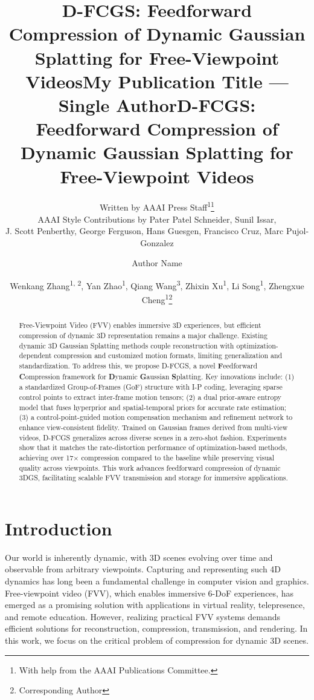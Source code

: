 \documentclass[letterpaper]{article} %
\title{D-FCGS: Feedforward Compression of Dynamic Gaussian Splatting for Free-Viewpoint Videos}
\author{
    Written by AAAI Press Staff\textsuperscript{\rm 1}\thanks{With help from the AAAI Publications Committee.}\\
    AAAI Style Contributions by Pater Patel Schneider,
    Sunil Issar,\\
    J. Scott Penberthy,
    George Ferguson,
    Hans Guesgen,
    Francisco Cruz\equalcontrib,
    Marc Pujol-Gonzalez\equalcontrib
}
\title{My Publication Title --- Single Author}
\author {
    Author Name
}
\title{D-FCGS: Feedforward Compression of Dynamic Gaussian Splatting for Free-Viewpoint Videos}
\author {
    Wenkang Zhang\textsuperscript{\rm 1, \rm 2},
    Yan Zhao\textsuperscript{\rm 1},
    Qiang Wang\textsuperscript{\rm 3},
    Zhixin Xu\textsuperscript{\rm 1}, 
    Li Song\textsuperscript{\rm 1}, 
    Zhengxue Cheng\textsuperscript{\rm 1}\thanks{Corresponding Author}
}
\begin{document}
\maketitle

\begin{abstract}
Free-Viewpoint Video (FVV) enables immersive 3D experiences, but efficient compression of dynamic 3D representation remains a major challenge.
%
Existing dynamic 3D Gaussian Splatting methods couple reconstruction with optimization-dependent compression and customized motion formats, limiting generalization and standardization. 
%
To address this, we propose D-FCGS, a novel \textbf{F}eedforward \textbf{C}ompression framework for \textbf{D}ynamic \textbf{G}aussian \textbf{S}platting. Key innovations include: (1) a standardized Group-of-Frames (GoF) structure with I-P coding, leveraging sparse control points to extract inter-frame motion tensors; (2) a dual prior-aware entropy model that fuses hyperprior and spatial-temporal priors for accurate rate estimation; (3) a control-point-guided motion compensation mechanism and refinement network to enhance view-consistent fidelity. 
%
Trained on Gaussian frames derived from multi-view videos, D-FCGS generalizes across diverse scenes in a zero-shot fashion. Experiments show that it matches the rate-distortion performance of optimization-based methods, achieving over 17$\times$ compression compared to the baseline while preserving visual quality across viewpoints. This work advances feedforward compression of dynamic 3DGS, facilitating scalable FVV transmission and storage for immersive applications.
\end{abstract}

\begin{links}
\end{links}

\section{Introduction}
Our world is inherently dynamic, with 3D scenes evolving over time and observable from arbitrary viewpoints. Capturing and representing such 4D dynamics has long been a fundamental challenge in computer vision and graphics. Free-viewpoint video (FVV), which enables immersive 6-DoF experiences, has emerged as a promising solution with applications in virtual reality, telepresence, and remote education. However, realizing practical FVV systems demands efficient solutions for reconstruction, compression, transmission, and rendering. In this work, we focus on the critical problem of compression for dynamic 3D scenes.
\end{document}

